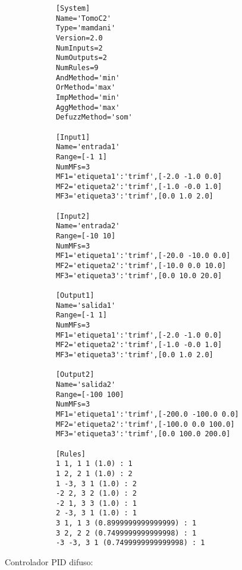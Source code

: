     \begin{longlisting}				
        \begin{verbatim}
            [System]
            Name='TomoC2'
            Type='mamdani'
            Version=2.0
            NumInputs=2
            NumOutputs=2
            NumRules=9
            AndMethod='min'
            OrMethod='max'
            ImpMethod='min'
            AggMethod='max'
            DefuzzMethod='som'

            [Input1]
            Name='entrada1'
            Range=[-1 1]
            NumMFs=3
            MF1='etiqueta1':'trimf',[-2.0 -1.0 0.0]
            MF2='etiqueta2':'trimf',[-1.0 -0.0 1.0]
            MF3='etiqueta3':'trimf',[0.0 1.0 2.0]

            [Input2]
            Name='entrada2'
            Range=[-10 10]
            NumMFs=3
            MF1='etiqueta1':'trimf',[-20.0 -10.0 0.0]
            MF2='etiqueta2':'trimf',[-10.0 0.0 10.0]
            MF3='etiqueta3':'trimf',[0.0 10.0 20.0]

            [Output1]
            Name='salida1'
            Range=[-1 1]
            NumMFs=3
            MF1='etiqueta1':'trimf',[-2.0 -1.0 0.0]
            MF2='etiqueta2':'trimf',[-1.0 -0.0 1.0]
            MF3='etiqueta3':'trimf',[0.0 1.0 2.0]

            [Output2]
            Name='salida2'
            Range=[-100 100]
            NumMFs=3
            MF1='etiqueta1':'trimf',[-200.0 -100.0 0.0]
            MF2='etiqueta2':'trimf',[-100.0 0.0 100.0]
            MF3='etiqueta3':'trimf',[0.0 100.0 200.0]

            [Rules]
            1 1, 1 1 (1.0) : 1
            1 2, 2 1 (1.0) : 2
            1 -3, 3 1 (1.0) : 2
            -2 2, 3 2 (1.0) : 2
            -2 1, 3 3 (1.0) : 1
            2 -3, 3 1 (1.0) : 1
            3 1, 1 3 (0.8999999999999999) : 1
            3 2, 2 2 (0.7499999999999998) : 1
            -3 -3, 3 1 (0.7499999999999998) : 1
        \end{verbatim}
    \end{longlisting}

    
    Controlador PID difuso:

